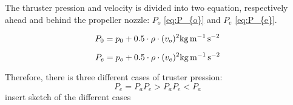 The thruster pression and velocity is divided into two equation, respectively ahead and behind the propeller nozzle: $P_{o}$ \eqref{eq:P_{o}} and $P_{e}$ \eqref{eq:P_{e}}.

\begin{equation}
P_{0} = p_{0} + 0.5 \cdot \rho \cdot(v_{o})^2 \si{\kilo\gram\per\meter\per\second\squared} \label{eq:P_{o}}
\end{equation}
\startexplain
{}
\stopexplain

\begin{equation}
P_{e} = p_{o} + 0.5 \cdot \rho \cdot(v_{e})^2 \si{\kilo\gram\per\meter\per\second\squared} \label{eq:P_{e}}
\end{equation}
\startexplain
{}
\stopexplain

Therefore, there is three different cases of truster pression:
\begin{equation}
P_{e} = P_{a}
P_{e} > P_{a}
P_{e} < P_{a}
\end{equation}
 insert sketch of the different cases





